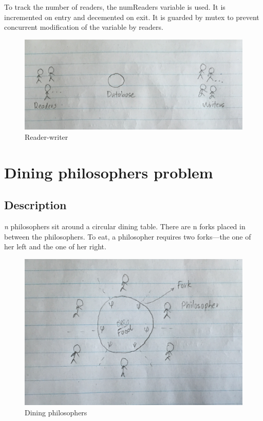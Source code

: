 \documentclass[twoside]{article}
\begin{document}
To track the number of readers, the numReaders variable is used. It is incremented on entry and decemented on exit. It is guarded by mutex to prevent concurrent modification of the variable by readers.

\begin{figure}
  \includegraphics[width=\linewidth]{img/rw.png}
  \caption{Reader-writer}
\end{figure}

\section{Dining philosophers problem}

\subsection{Description}

{\it n} philosophers sit around a circular dining table.  There are n forks placed in between the philosophers. To eat, a philosopher requires two forks---the one of her left and the one of her right.

\begin{figure}
  \includegraphics[width=\linewidth]{img/phil.png}
  \caption{Dining philosophers}
\end{figure}
\end{document}
